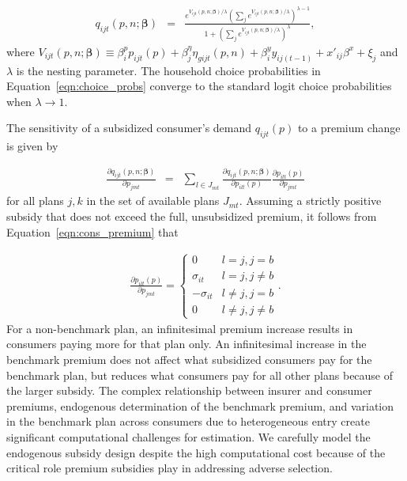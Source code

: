 \documentclass[12pt]{article}
\begin{document}
\vspace{-0.4in}		
\begin{eqnarray}
\label{eqn:choice_probs}
	q_{ijt}(\textit{p},\textit{n};\boldsymbol{\beta}) &=&  \frac{e^{V_{ijt}(\textit{p},\textit{n};\boldsymbol{\beta})/\lambda}\left(\sum_{j } e^{V_{ijt}(\textit{p},\textit{n};\boldsymbol{\beta})/\lambda}\right)^{\lambda-1}}{1 + \left(\sum_{j} e^{V_{ijt}(\textit{p},\textit{n};\boldsymbol{\beta})/\lambda}\right)^{\lambda}},
\end{eqnarray}
\noindent where $V_{ijt}(\textit{p},\textit{n};\boldsymbol{\beta}) \equiv \beta_{i}^p p_{ijt}(\textit{p}) + \beta_j^{\eta} \eta_{gijt}(\textit{p},\textit{n})   + \beta_i^y y_{ij(t-1)} + x'_{ij}\beta^x + \xi_{j}$ and $\lambda$ is the nesting parameter. The household choice probabilities in Equation~\eqref{eqn:choice_probs} converge to the standard logit choice probabilities when $\lambda \rightarrow 1$.

The sensitivity of a subsidized consumer's demand $q_{ijt}(\textit{p})$ to a premium change is given by  

\vspace{-0.4in}
\begin{eqnarray*}
	\frac{\partial q_{ijt}(\textit{p},\textit{n};\boldsymbol{\beta})}{\partial p_{jmt}} &=& \sum_{l \in J_{mt}} \frac{ \partial q_{ijt}(\textit{p},\textit{n};\boldsymbol{\beta})}{\partial p_{ilt}(\textit{p})}\frac{ \partial p_{ilt}(\textit{p})}{\partial p_{jmt}}
\end{eqnarray*}
\noindent for all plans $j,k$ in the set of available plans $J_{mt}$.  Assuming a strictly positive subsidy that does not exceed the full, unsubsidized premium, it follows from Equation~\eqref{eqn:cons_premium} that

\vspace{-0.4in}
\singlespacing
\begin{eqnarray}
\label{eqn:price_partial_formula}
    \frac{\partial p_{ilt}(\textit{p})}{\partial p_{jmt}} = 
    \begin{cases} 
	    0 & l=j, j = b \\		
		\sigma_{it} & l = j, j \neq b \\     
		-\sigma_{it} & l \neq j, j = b \\
		0 & l \neq j, j \neq b  
    \end{cases}.
\end{eqnarray}
\doublespacing
For a non-benchmark plan, an infinitesimal premium increase results in consumers paying more for that plan only.  An infinitesimal increase in the benchmark premium does not affect what subsidized consumers pay for the benchmark plan, but reduces what consumers pay for all other plans because of the larger subsidy. The complex relationship between insurer and consumer premiums, endogenous determination of the benchmark premium, and variation in the benchmark plan across consumers due to heterogeneous entry create significant computational challenges for estimation.  We carefully model the endogenous subsidy design despite the high computational cost because of the critical role premium subsidies play in addressing adverse selection.  
\end{document}

